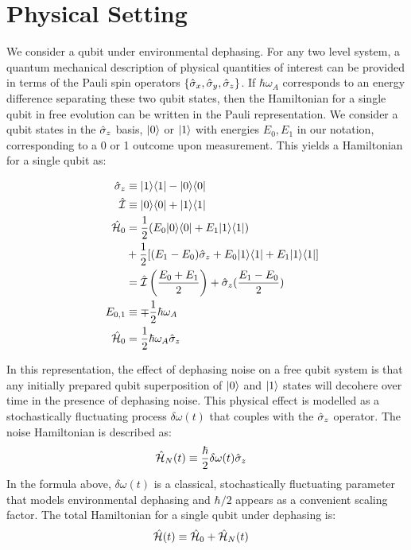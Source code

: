 \section{Physical Setting \label{sec:app:setup}}


We consider a qubit under environmental dephasing.  For any two level system, a quantum mechanical description of physical quantities of interest can be provided in terms of the Pauli spin operators $\{ \hat{\sigma}_{x}, \hat{\sigma}_{y}, \hat{\sigma}_{z}\}$. If $\hbar \omega_A$ corresponds to an energy difference separating these two qubit states, then the Hamiltonian for a single qubit in free evolution can be written in the Pauli representation. We consider a qubit states in the $\hat{\sigma}_{z}$ basis, $| 0 \rangle$ or $| 1 \rangle$ with energies $E_0, E_1$ in our notation, corresponding to a 0 or 1 outcome upon measurement. This yields a Hamiltonian for a single qubit as:

\begin{align}
\hat{\sigma}_{z} &\equiv | 1 \rangle\langle 1 | - | 0 \rangle\langle 0 | \\
\hat{\mathcal{I}} & \equiv | 0 \rangle\langle 0 | + | 1 \rangle\langle 1 | \\
\hat{\mathcal{H}}_0 & = \frac{1}{2} (E_0| 0 \rangle\langle 0 |+ E_1| 1 \rangle\langle 1 |) \\
& + \frac{1}{2} [(E_1 - E_0)\hat{\sigma}_{z} + E_0 | 1 \rangle\langle 1 | + E_1 | 1 \rangle\langle 1 |]\\
& = \hat{\mathcal{I}} \left( \frac{E_0 + E_1}{2} \right) + \hat{\sigma}_{z}(\frac{E_1 - E_0}{2}) \\
\quad E_{0,1} &\equiv \mp \frac{1}{2} \hbar \omega_A \\
\hat{\mathcal{H}}_0 &= \frac{1}{2} \hbar \omega_A \hat{\sigma}_{z}
\end{align}

In this representation, the effect of dephasing noise on a free qubit system is that any initially prepared qubit superposition of $| 0 \rangle$ and $| 1 \rangle$ states will decohere over time in the presence of dephasing noise. This physical effect is modelled as a stochastically fluctuating process $\delta\omega(t)$ that couples with the $\hat{\sigma}_{z}$ operator. The noise Hamiltonian is described as:
\begin{align} 
\hat{\mathcal{H}}_{N}(t) & \equiv \frac{\hbar}{2}\delta\omega(t)\hat{\sigma}_{z}
\end{align}
In the formula above, $\delta\omega(t)$ is a classical, stochastically fluctuating parameter that models environmental dephasing and $\hbar/2$ appears as a convenient scaling factor. The total Hamiltonian for a single qubit under dephasing is:
\begin{align} 
\hat{\mathcal{H}}(t) &\equiv \hat{\mathcal{H}}_0 + \hat{\mathcal{H}}_{N}(t)
\end{align}

